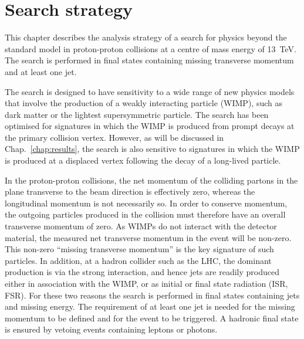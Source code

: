 \chapter{Search strategy}
\label{chap:analysis}

This chapter describes the analysis strategy of a search for physics 
beyond the standard model in proton-proton collisions at a centre of mass 
energy of 13~TeV. The search is performed in final states containing missing 
transverse momentum and at least one jet. 

The search is designed to have sensitivity to a wide range of new physics 
models that involve the production of a weakly interacting 
particle (WIMP), such as dark matter or the lightest supersymmetric particle. 
The search has been optimised for signatures in which the WIMP is produced from 
prompt decays at the primary collision vertex. However, as will be discussed in 
Chap.~\ref{chap:results}, the search is also sensitive to signatures in which 
the WIMP is produced at a displaced vertex following the decay of a long-lived 
particle. %

In the proton-proton collisions, the net momentum of the colliding partons in 
the plane transverse to the beam direction is effectively zero, whereas the 
longitudinal momentum is not necessarily so. In order to conserve momentum, the 
outgoing particles produced in the collision must therefore have an overall 
transverse momentum of zero. As WIMPs do not interact with the detector 
material, the measured net transverse momentum in the event will be non-zero. 
This non-zero ``missing transverse momentum'' is the key signature of such 
particles. In addition, at a hadron collider such as the LHC, the dominant 
production is via the strong interaction, and hence jets are readily produced 
either in association with the WIMP, or as initial or final state radiation 
(ISR, FSR). For these two reasons the search is performed in final states 
containing jets and missing energy. The requirement of at least one jet is 
needed for the missing momentum to be defined and for the event to be 
triggered. A hadronic final state is ensured by vetoing events containing 
leptons or photons.

